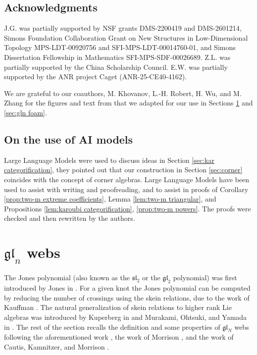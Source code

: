 \documentclass[12pt]{amsart}
\theoremstyle{definition}
\theoremstyle{remark}
\numberwithin{equation}{section}
\numberwithin{figure}{section}
\newcommand{\GL}{\mathfrak{gl}}
\begin{document}
\subsection*{Acknowledgments} J.G. was partially supported by NSF grants DMS-2200419 and DMS-2601214, Simons Foundation Collaboration Grant on New Structures in Low-Di\-mensional Topology MPS-LDT-00920756 and SFI-MPS-LDT-00014760-01, and Simons Dissertation Fellowship in Mathematics SFI-MPS-SDF-00026689. Z.L. was partially supported by the China Scholarship Council. E.W. was partially supported by the ANR project Caget (ANR-25-CE40-4162).

We are grateful to our coauthors, M. Khovanov, L.-H. Robert, H. Wu, and M. Zhang for the figures and text from \cite{RW2020, grlj20266valentvertexmathfrakglnweb} that we adapted for our use in Sections \ref{sec:gl_nweb} and \ref{sec:gln foam}.

\subsection*{On the use of AI models}
Large Language Models were used to discuss ideas in Section \ref{sec:kar categorification}, they pointed out that our construction in Section \ref{sec:corner} coincides with the concept of corner algebras.
Large Language Models have been used to assist with writing and proofreading, and to assist in proofs of Corollary \ref{prop:two-m extreme coefficients}, Lemma \ref{lem:two-m triangular}, and Propositions \ref{lem:karoubi categorification}, \ref{prop:two-m powers}. 
The proofs were checked and then rewritten by the authors. 

\section{$\GL_n$ webs}\label{sec:gl_nweb}
The Jones polynomial (also known as the $\mathfrak{sl}_2$ or the $\GL_2$ polynomial) was first introduced by Jones in \cite{Jon1985,Jon1987}. For a given knot the Jones polynomial can be computed by reducing the number of crossings using the skein relations, due to the work of Kauffman \cite{Kau1987}. The natural generalization of skein relations to higher rank Lie algebras was introduced by Kuperberg in \cite{Kup1996} and Murakami, Ohtsuki, and Yamada in \cite{MOY1998}. The rest of the section recalls the definition and some properties of $\GL_N$ webs following the aforementioned work \cite{MOY1998}, the work of Morrison \cite{Mor2007}, and the work of Cautis, Kamnitzer, and Morrison \cite{CKM2014}. 
\end{document}
